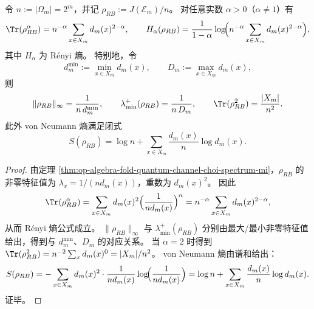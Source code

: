 \begin{corollary}\label{cor:op-algebra-fold-quantum-channel-choi-renyi-moments}
令 \(n:=|\Omega_m|=2^m\)，并记 \(\rho_{RB}:=J(\mathcal{E}_m)/n\)。
对任意实数 \(\alpha>0\)（\(\alpha\neq 1\)）有
\[
\Tr(\rho_{RB}^\alpha)=n^{-\alpha}\sum_{x\in X_m} d_m(x)^{2-\alpha},
\qquad
H_\alpha(\rho_{RB})=\frac{1}{1-\alpha}\log\!\Bigl(n^{-\alpha}\sum_{x\in X_m} d_m(x)^{2-\alpha}\Bigr),
\]
其中 \(H_\alpha\) 为 Rényi 熵。
特别地，令
\[
d_m^{\min}:=\min_{x\in X_m}d_m(x),
\qquad
D_m:=\max_{x\in X_m}d_m(x),
\]
则
\[
\|\rho_{RB}\|_\infty=\frac{1}{n\,d_m^{\min}},
\qquad
\lambda_{\min}^{+}(\rho_{RB})=\frac{1}{n\,D_m},
\qquad
\Tr(\rho_{RB}^2)=\frac{|X_m|}{n^2}.
\]
此外 von Neumann 熵满足闭式
\[
S(\rho_{RB})=\log n+\sum_{x\in X_m}\frac{d_m(x)}{n}\log d_m(x).
\]
\end{corollary}
\begin{proof}
由定理 \ref{thm:op-algebra-fold-quantum-channel-choi-spectrum-mi}，\(\rho_{RB}\) 的非零特征值为 \(\lambda_x=1/(n d_m(x))\)，重数为 \(d_m(x)^2\)。
因此
\[
\Tr(\rho_{RB}^\alpha)=\sum_{x\in X_m} d_m(x)^2\Bigl(\frac{1}{n d_m(x)}\Bigr)^\alpha
=n^{-\alpha}\sum_{x\in X_m} d_m(x)^{2-\alpha},
\]
从而 Rényi 熵公式成立。
\(\|\rho_{RB}\|_\infty\) 与 \(\lambda_{\min}^+(\rho_{RB})\) 分别由最大/最小非零特征值给出，得到与 \(d_m^{\min}\)、\(D_m\) 的对应关系。
当 \(\alpha=2\) 时得到
\(
\Tr(\rho_{RB}^2)=n^{-2}\sum_x d_m(x)^{0}=|X_m|/n^2
\)。
von Neumann 熵由谱和给出：
\[
S(\rho_{RB})
=-\sum_{x\in X_m}d_m(x)^2\cdot \frac{1}{n d_m(x)}\log\!\Bigl(\frac{1}{n d_m(x)}\Bigr)
=\log n+\sum_{x\in X_m}\frac{d_m(x)}{n}\log d_m(x).
\]
证毕。
\end{proof}

